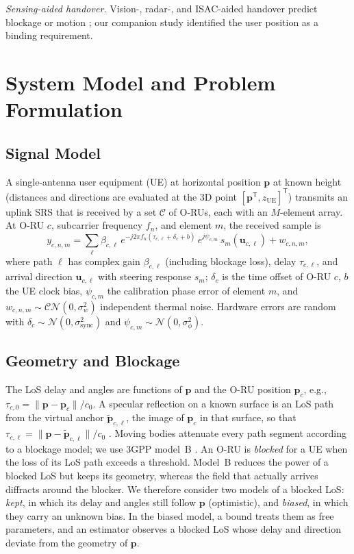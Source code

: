 \documentclass[conference]{IEEEtran}
\begin{document}
\textit{Sensing-aided handover.} Vision-, radar-, and ISAC-aided
handover predict blockage or motion
\cite{charan2021vision,li2025lookbefore}; our companion study
\cite{natanzi2027companion} identified the user position as a binding
requirement.

\section{System Model and Problem Formulation}
\subsection{Signal Model}
A single-antenna user equipment (UE) at horizontal position $\mathbf p$
at known height (distances and directions are evaluated at the 3D point
$[\mathbf p^{\mathsf T},z_{\mathrm{UE}}]^{\mathsf T}$) transmits an uplink SRS that is received by a set $\mathcal C$ of O-RUs,
each with an $M$-element array. At O-RU $c$, subcarrier frequency
$f_n$, and element $m$, the received sample is
\begin{equation}
y_{c,n,m}=\sum_{\ell}\beta_{c,\ell}\,
e^{-j2\pi f_n(\tau_{c,\ell}+\delta_c+b)}\,
e^{j\psi_{c,m}}\,s_m(\mathbf u_{c,\ell})+w_{c,n,m},
\label{eq:signal}
\end{equation}
where path $\ell$ has complex gain $\beta_{c,\ell}$ (including blockage
loss), delay $\tau_{c,\ell}$, and arrival direction
$\mathbf u_{c,\ell}$ with steering response $s_m$; $\delta_c$ is the time
offset of O-RU $c$, $b$ the UE clock bias, $\psi_{c,m}$ the calibration
phase error of element $m$, and $w_{c,n,m}\sim\mathcal{CN}(0,\sigma_w^2)$
independent thermal noise. Hardware
errors are random with $\delta_c\sim\mathcal N(0,\sigma_{\mathrm{sync}}^2)$
and $\psi_{c,m}\sim\mathcal N(0,\sigma_\phi^2)$.

\subsection{Geometry and Blockage}
The LoS delay and angles are functions of $\mathbf p$ and the O-RU
position $\mathbf p_c$, e.g., $\tau_{c,0}=\|\mathbf p-\mathbf p_c\|/c_0$.
A specular reflection on a known surface is an LoS path from the virtual
anchor $\tilde{\mathbf p}_{c,\ell}$, the image of $\mathbf p_c$ in that
surface, so that $\tau_{c,\ell}=\|\mathbf p-\tilde{\mathbf p}_{c,\ell}\|/c_0$
\cite{leitinger2015evaluation}. Moving bodies attenuate every path
segment according to a blockage model; we use 3GPP model~B
\cite{3gpp38901}. An O-RU is \emph{blocked} for a UE when the loss of its LoS path exceeds
a threshold. Model~B reduces the power of a blocked LoS
but keeps its geometry, whereas the field that actually arrives
diffracts around the blocker. We therefore consider two models of a
blocked LoS: \emph{kept}, in which its delay and angles still follow
$\mathbf p$ (optimistic), and \emph{biased}, in which they carry an
unknown bias. In the biased model, a bound treats them as free parameters, and an
estimator observes a blocked LoS whose delay and direction deviate from
the geometry of $\mathbf p$.
\end{document}
